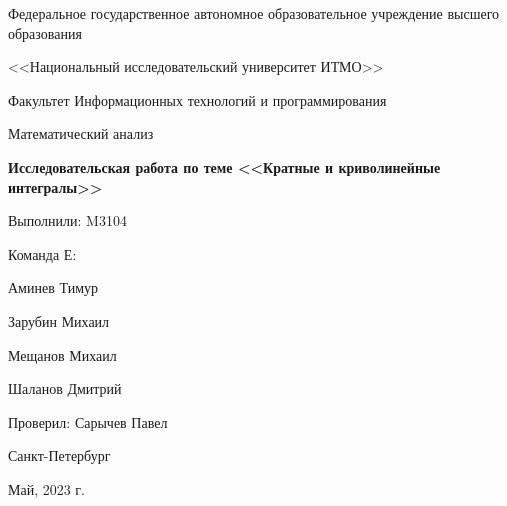 \begin{titlepage}
  \begin{center}
    \Large
    Федеральное государственное автономное образовательное учреждение
    высшего образования

    <<Национальный исследовательский университет ИТМО>>

    \vspace{1cm}

    \Large
    Факультет Информационных технологий и программирования

    \vspace{1cm}
    Математический анализ

    \vspace{0.5cm}
    \LARGE
    \textbf{Исследовательская работа по теме
      <<Кратные и криволинейные интегралы>>
    }
  \end{center}

  \vspace{4cm}
  \vfill

  \begin{flushright}
    \Large
    Выполнили: M3104

    Команда Е:

    Аминев Тимур

    Зарубин Михаил

    Мещанов Михаил

    Шаланов Дмитрий


    Проверил: Сарычев Павел
  \end{flushright}

  \vfill

  \begin{center}
    \Large
    Санкт-Петербург

    Май, 2023 г.
  \end{center}
\end{titlepage}
